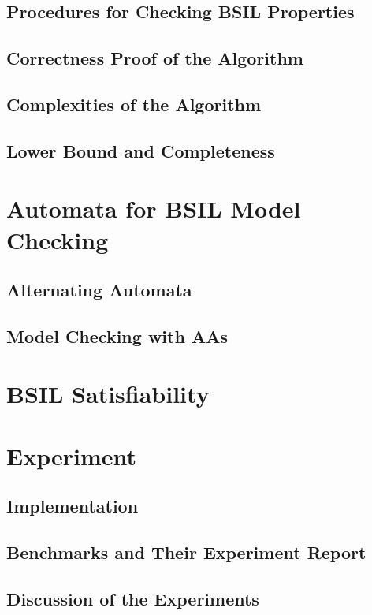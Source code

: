 \subsection{Procedures for Checking BSIL Properties}
\subsection{Correctness Proof of the Algorithm}
\subsection{Complexities of the Algorithm}
\subsection{Lower Bound and Completeness}

\section{Automata for BSIL Model Checking}
\subsection{Alternating Automata}
\subsection{Model Checking with AAs}

\section{BSIL Satisfiability}

\section{Experiment}
\subsection{Implementation}
\subsection{Benchmarks and Their Experiment Report}
\subsection{Discussion of the Experiments}